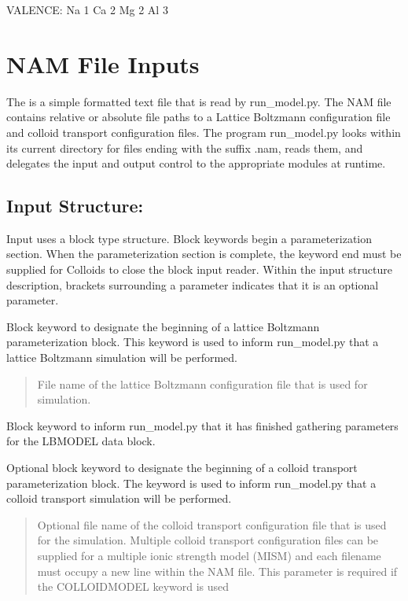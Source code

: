 \documentclass[letterpaper,10pt,english]{sphinxmanual}
\begin{document}

VALENCE: Na 1 Ca 2 Mg 2 Al 3


\section{NAM File Inputs}
\label{\detokenize{index:nam-file-inputs}}
The  is a simple formatted text file that is read
by run\_model.py. The NAM file contains relative or absolute file paths
to a Lattice Boltzmann configuration file and colloid transport
configuration files. The program run\_model.py looks within its current
directory for files ending with the suffix .nam, reads them, and
delegates the input and output control to the appropriate 
modules at runtime.


\subsection{Input Structure:}
\label{\detokenize{index:input-structure}}
Input uses a block type structure. Block keywords begin a
parameterization section. When the parameterization section is complete,
the keyword end must be supplied for Colloids to close the block
input reader. Within the input structure description, brackets
surrounding a parameter indicates that it is an optional parameter.

 Block keyword to designate the beginning of a
lattice Boltzmann parameterization block. This keyword is used to inform
run\_model.py that a lattice Boltzmann simulation will be performed.
\begin{quote}

 File name of the lattice Boltzmann
configuration file that is used for simulation.
\end{quote}

 Block keyword to inform run\_model.py that it has finished
gathering parameters for the LBMODEL data block.

 Optional block keyword to designate the
beginning of a colloid transport parameterization block. The keyword is
used to inform run\_model.py that a colloid transport simulation will be
performed.
\begin{quote}

 Optional file name of the colloid
transport configuration file that is used for the simulation.
Multiple colloid transport configuration files can be supplied for a
multiple ionic strength model (MISM) and each filename must occupy a
new line within the NAM file. This parameter is required if the
COLLOIDMODEL keyword is used
\end{quote}
\end{document}
